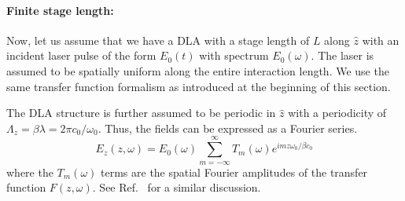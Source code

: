 \paragraph{Finite stage length:}


Now, let us assume that we have a DLA with a stage length of $L$ along $\hat{z}$ with an incident laser pulse of the form $E_0(t)$ with spectrum $E_0(\omega)$. The laser is assumed to be spatially uniform along the entire interaction length. We use the same transfer function formalism as introduced at the beginning of this section.

The DLA structure is further assumed to be periodic in $\hat{z}$ with a periodicity of $\Lambda_z = \beta \lambda = 2\pi c_0/\omega_0$. Thus, the fields can be expressed as a Fourier series.
\begin{equation}
    E_z(z,\omega) = E_0(\omega) \sum_{m=-\infty}^{\infty} T_m(\omega) e^{i m z \omega_0 / \beta c_0}
\end{equation}
where the $T_m(\omega)$ terms are the spatial Fourier amplitudes of the transfer function $F(z,\omega)$. See Ref.~\cite{plettner2009photonic} for a similar discussion.

